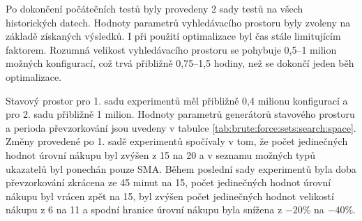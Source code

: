 Po dokončení počátečních testů byly provedeny 2 sady testů na všech historických datech.
Hodnoty parametrů vyhledávacího prostoru byly zvoleny na základě získaných výsledků.
I při použití optimalizace byl čas stále limitujícím faktorem.
Rozumná velikost vyhledávacího prostoru se pohybuje 0,5--1 milion možných konfigurací, což trvá přibližně 0,75--1,5 hodiny, než se dokončí jeden běh optimalizace.

Stavový prostor pro 1. sadu experimentů měl přibližně 0,4 milionu konfigurací a pro 2. sadu přibližně 1 milion.
Hodnoty parametrů generátorů stavového prostoru a perioda převzorkování jsou uvedeny v tabulce \ref{tab:brute:force:sets:search:space}.
Změny provedené po 1. sadě experimentů spočívaly v tom, že počet jedinečných hodnot úrovní nákupu byl zvýšen z 15 na 20 a v seznamu možných typů ukazatelů byl ponechán pouze SMA.
Během poslední sady experimentů byla doba převzorkování zkrácena ze 45 minut na 15, počet jedinečných hodnot úrovní nákupu byl vrácen zpět na 15, byl zvýšen počet jedinečných hodnot velikostí nákupu z 6 na 11 a spodní hranice úrovní nákupu byla snížena z \(-20 \%\) na \(-40 \%\).

